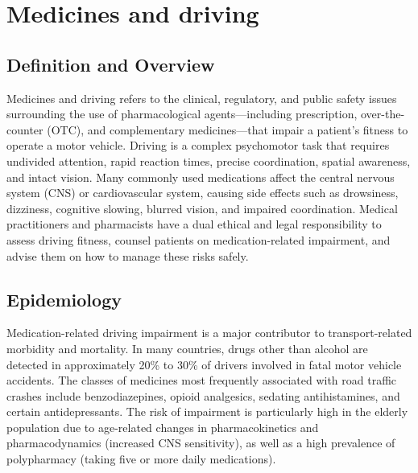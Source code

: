 \chapter{Medicines and driving}

\section*{Definition and Overview}
Medicines and driving refers to the clinical, regulatory, and public safety issues surrounding the use of pharmacological agents—including prescription, over-the-counter (OTC), and complementary medicines—that impair a patient's fitness to operate a motor vehicle. Driving is a complex psychomotor task that requires undivided attention, rapid reaction times, precise coordination, spatial awareness, and intact vision. Many commonly used medications affect the central nervous system (CNS) or cardiovascular system, causing side effects such as drowsiness, dizziness, cognitive slowing, blurred vision, and impaired coordination. Medical practitioners and pharmacists have a dual ethical and legal responsibility to assess driving fitness, counsel patients on medication-related impairment, and advise them on how to manage these risks safely.

\section*{Epidemiology}
Medication-related driving impairment is a major contributor to transport-related morbidity and mortality. In many countries, drugs other than alcohol are detected in approximately 20\% to 30\% of drivers involved in fatal motor vehicle accidents. The classes of medicines most frequently associated with road traffic crashes include benzodiazepines, opioid analgesics, sedating antihistamines, and certain antidepressants. The risk of impairment is particularly high in the elderly population due to age-related changes in pharmacokinetics and pharmacodynamics (increased CNS sensitivity), as well as a high prevalence of polypharmacy (taking five or more daily medications).

